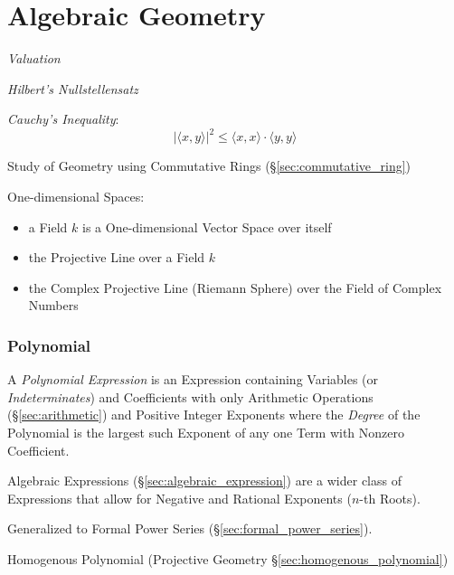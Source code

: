 \part{Algebraic Geometry}\label{part:algebraic_geometry}

\emph{Valuation}

\emph{Hilbert's Nullstellensatz}

\emph{Cauchy's Inequality}:
\[
    |\langle x,y \rangle|^2 \leq \langle x,x \rangle \cdot \langle
    y,y \rangle
\]

Study of Geometry using Commutative Rings
(\S\ref{sec:commutative_ring})

One-dimensional Spaces:

\begin{itemize}
\item a Field $k$ is a One-dimensional Vector Space over itself
\item the Projective Line over a Field $k$
\item the Complex Projective Line (Riemann Sphere) over the Field of Complex
  Numbers
\end{itemize}



\section{Polynomial}\label{sec:polynomial}

A \emph{Polynomial Expression} is an Expression containing Variables (or
\emph{Indeterminates}) and Coefficients with only Arithmetic Operations
(\S\ref{sec:arithmetic}) and Positive Integer Exponents where the \emph{Degree}
of the Polynomial is the largest such Exponent of any one Term with Nonzero
Coefficient.

\fist Algebraic Expressions (\S\ref{sec:algebraic_expression}) are a wider
class of Expressions that allow for Negative and Rational Exponents ($n$-th
Roots).

\fist Generalized to Formal Power Series (\S\ref{sec:formal_power_series}).

\fist Homogenous Polynomial (Projective Geometry
\S\ref{sec:homogenous_polynomial})

